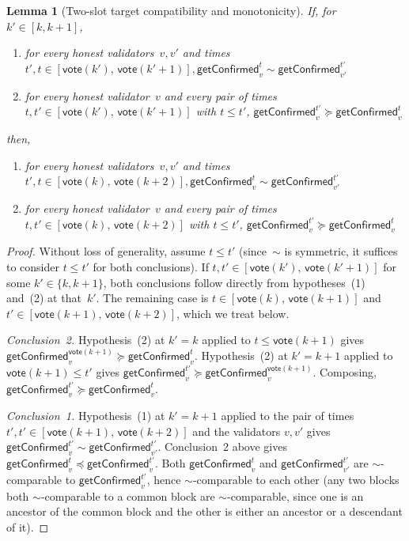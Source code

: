 \ifx\litemode\undefined\documentclass{article}\fi
\newcommand{\vote}{\mathsf{vote}}
\newcommand{\getConfirmed}{\textsf{getConfirmed}\xspace}
\theoremstyle{plain}
\newtheorem{lemma}{Lemma}
\theoremstyle{definition}
\theoremstyle{remark}
\begin{document}
\begin{lemma}[Two-slot target compatibility and monotonicity]\label{rev:lem:two-slot-target-compat-monotone}
  If, for $k' \in [k,k+1]$,
  \begin{enumerate}
    \item for every honest validators~$v,v'$ and times $t',t \in [\vote(k'),\, \vote(k'+1)], \getConfirmed_v^{t} \sim \getConfirmed_{v'}^{t'}$
    \item for every honest validator~$v$ and every pair of times $t, t' \in [\vote(k'),\, \vote(k'+1)]$ with $t \leq t'$, $\getConfirmed_v^{t'} \succeq \getConfirmed_v^t$
  \end{enumerate}
  then,
  \begin{enumerate}
    \item for every honest validators~$v,v'$ and times $t',t \in [\vote(k),\, \vote(k+2)], \getConfirmed_v^{t} \sim \getConfirmed_{v'}^{t'}$
    \item for every honest validator~$v$ and every pair of times $t, t' \in [\vote(k),\, \vote(k+2)]$ with $t \leq t'$, $\getConfirmed_v^{t'} \succeq \getConfirmed_v^t$
  \end{enumerate}  
\end{lemma}
\begin{proof}
Without loss of generality, assume $t \leq t'$ (since~$\sim$ is symmetric, it suffices to consider $t \leq t'$ for both conclusions). If $t, t' \in [\vote(k'),\, \vote(k'+1)]$ for some $k' \in \{k, k+1\}$, both conclusions follow directly from hypotheses~(1) and~(2) at that~$k'$. The remaining case is $t \in [\vote(k),\, \vote(k+1)]$ and $t' \in [\vote(k+1),\, \vote(k+2)]$, which we treat below.

\emph{Conclusion~2.}
Hypothesis~(2) at $k' = k$ applied to $t \leq \vote(k+1)$ gives $\getConfirmed_v^{\vote(k+1)} \succeq \getConfirmed_v^t$. Hypothesis~(2) at $k' = k+1$ applied to $\vote(k+1) \leq t'$ gives $\getConfirmed_v^{t'} \succeq \getConfirmed_v^{\vote(k+1)}$. Composing, $\getConfirmed_v^{t'} \succeq \getConfirmed_v^t$.

\emph{Conclusion~1.}
Hypothesis~(1) at $k' = k+1$ applied to the pair of times $t', t' \in [\vote(k+1),\, \vote(k+2)]$ and the validators $v, v'$ gives $\getConfirmed_v^{t'} \sim \getConfirmed_{v'}^{t'}$. Conclusion~2 above gives $\getConfirmed_v^t \preceq \getConfirmed_v^{t'}$. Both $\getConfirmed_v^t$ and $\getConfirmed_{v'}^{t'}$ are $\sim$-comparable to $\getConfirmed_v^{t'}$, hence $\sim$-comparable to each other (any two blocks both $\sim$-comparable to a common block are $\sim$-comparable, since one is an ancestor of the common block and the other is either an ancestor or a descendant of it).
\end{proof}
\end{document}

